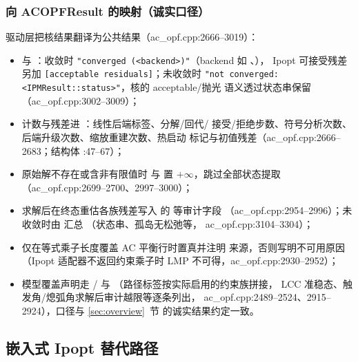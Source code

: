 \subsubsection*{向 ACOPFResult 的映射（诚实口径）}
驱动层把核结果翻译为公共结果（ac\_opf.cpp:2666--3019）：
\begin{itemize}
  \item {} 与 ：收敛时
        \texttt{"converged (<backend>)"}（backend 如
        、），
        Ipopt 可接受残差另加 \texttt{[acceptable residuals]}；未收敛时
        \texttt{"not converged: <IPMResult::status>"}，核的 acceptable/抛光
        语义透过状态串保留（ac\_opf.cpp:3002--3009）；
  \item 计数与残差进 ：线性后端标签、分解/回代/
        接受/拒绝步数、符号分析次数、后端升级次数、缩放重建次数、热启动
        标记与初值残差（ac\_opf.cpp:2666--2683；结构体
        :47--67）；
  \item 原始解不存在或含非有限值时  与
         置 $+\infty$，跳过全部状态提取
        （ac\_opf.cpp:2699--2700、2997--3000）；
  \item 求解后在终态重估各族残差写入  的
         等审计字段
        （ac\_opf.cpp:2954--2996）；未收敛时由 
        汇总 （状态串、孤岛无松弛等，
        ac\_opf.cpp:3104--3304）；
  \item {} 仅在等式乘子长度覆盖 AC 平衡行时置真并注明
        来源，否则写明不可用原因（Ipopt 适配器不返回约束乘子时 LMP
        不可得，ac\_opf.cpp:2930--2952）；
  \item 模型覆盖声明走 /
        与 （路径标签按实际启用的约束族拼接，
        LCC 准稳态、触发角/熄弧角求解后审计越限等逐条列出，
        ac\_opf.cpp:2489--2524、2915--2924），口径与 \ref{sec:overview}~节
        的诚实结果约定一致。
\end{itemize}

\subsection{嵌入式 Ipopt 替代路径}\label{subsec:pipm-ipopt}

